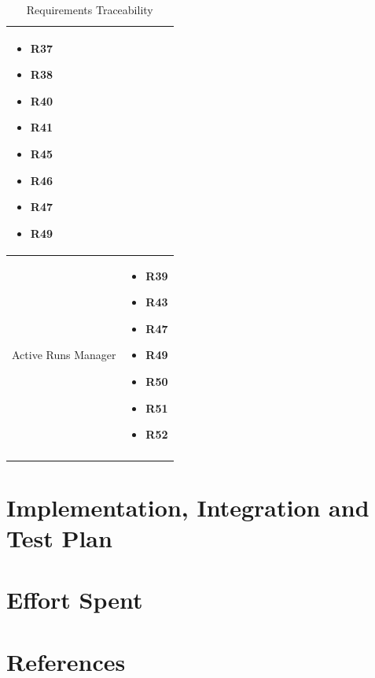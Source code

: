 \documentclass[titlepage]{article}
\begin{document}
\begin{longtable}{ p{5 cm} | p{8 cm} }
\begin{itemize}
			\item {\bf R37} 
			\item {\bf R38} 
			\item {\bf R40} 
			\item {\bf R41} 
			\item {\bf R45} 
			\item {\bf R46} 
			\item {\bf R47} 
			\item {\bf R49} 
		\end{itemize}		
		\\	 \hline	
		\newline Active Runs Manager & 
		\begin{itemize}
			\item {\bf R39} 
			\item {\bf R43} 
			\item {\bf R47} 
			\item {\bf R49} 
			\item {\bf R50} 
			\item {\bf R51} 
			\item {\bf R52} 
		\end{itemize}		
		\\	 \hline		
		\caption{Requirements Traceability}	
						
	\end{longtable}

\pagebreak


\section{Implementation, Integration and Test Plan}
\pagebreak


\section{Effort Spent}
\pagebreak


\section{References}
\end{document}
